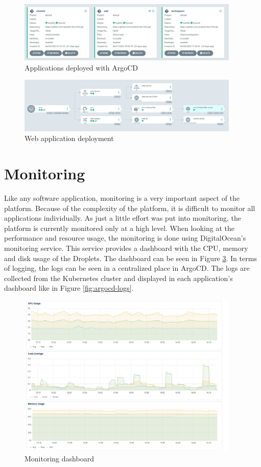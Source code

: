 \documentclass[12pt,a4paper]{report}
\begin{document}
\begin{figure}[h]
	\centering
	\includegraphics[width=400px]{./pics/argocd-apps.png}
	\caption{Applications deployed with ArgoCD}
	\label{fig:argocd-apps}
\end{figure}

\begin{figure}[h]
	\centering
	\includegraphics[width=400px]{./pics/argocd-web.png}
	\caption{Web application deployment}
	\label{fig:argocd-web}
\end{figure}

\newpage
\section{Monitoring}
Like any software application, monitoring is a very important aspect of the platform. Because of the complexity of the platform, it is difficult to monitor all applications individually. As just a little effort was put into monitoring, the platform is currently monitored only at a high level. When looking at the performance and resource usage, the monitoring is done using DigitalOcean's monitoring service. This service provides a dashboard with the CPU, memory and disk usage of the Droplets. The dashboard can be seen in Figure \ref{fig:monitoring-dashboard}. In terms of logging, the logs can be seen in a centralized place in ArgoCD. The logs are collected from the Kubernetes cluster and displayed in each application's dashboard like in Figure \ref{fig:argocd-logs}.

\begin{figure}[h]
	\centering
	\includegraphics[width=400px]{./pics/monitoring-dashboard.png}
	\caption{Monitoring dashboard}
	\label{fig:monitoring-dashboard}
\end{figure}
\end{document}
